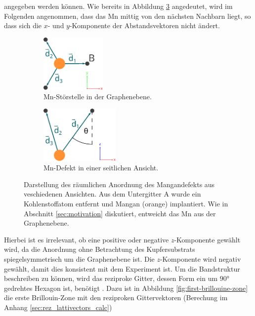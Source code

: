 angegeben werden können.
Wie bereits in Abbildung \ref{fig:mangan_impurity} angedeutet, wird im Folgenden angenommen, dass das Mn mittig von den nächsten Nachbarn liegt, so dass 
sich die $x$- und $y$-Komponente der Abstandsvektoren nicht ändert.
\begin{figure}
    \begin{subfigure}{0.48\textwidth}%
    \centering%
    \includegraphics[height = 2.8cm]{Plots/mangan_impurity_inplane.pdf}%
    \caption{Mn-Störstelle in der Graphenebene.}%
    \label{fig:mangan_impurity_inplane}%
    \end{subfigure}%
    \hfill%
    \begin{subfigure}{0.48\textwidth}%
    \centering%
    \includegraphics[height = 2.8cm]{Plots/mangan_impurity_z_component.pdf}%
    \caption{Mn-Defekt in einer seitlichen Ansicht.}%
    \label{fig:mangan_impurity_z_component}%
    \end{subfigure}%
    \caption{Darstellung des räumlichen Anordnung des Mangandefekts aus veschiedenen Ansichten.
    Aus dem Untergitter A wurde ein Kohlenstoffatom entfernt und Mangan (orange) implantiert.
    Wie in Abschnitt \ref{sec:motivation} diskutiert, entweicht das Mn aus der Graphenebene.}%
    \label{fig:mangan_impurity}%
\end{figure}%
Hierbei ist es irrelevant, ob eine positive oder negative $z$-Komponente gewählt wird, da die Anordnung ohne Betrachtung des Kupfersubstrats 
spiegelsymmetrisch um die Graphenebene ist. 
Die $z$-Komponente wird negativ gewählt, damit dies konsistent mit dem Experiment ist.
Um die Bandstruktur beschreiben zu können, wird das reziproke Gitter, 
dessen Form ein um $\ang{90;;}$ gedrehtes Hexagon ist, benötigt \cite{honey}.
Dazu ist in Abbildung \ref{fig:first-brillouine-zone} die erste Brillouin-Zone mit den 
reziproken Gittervektoren (Berechung im Anhang \ref{sec:rez_lattivectors_calc})
